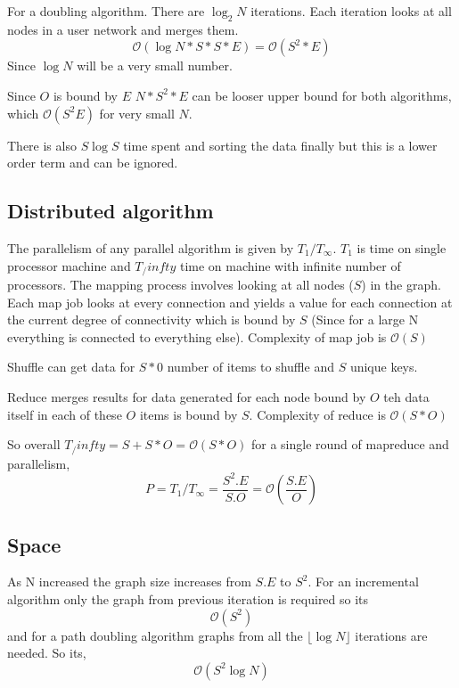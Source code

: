 \documentclass[a4paper]{article}
\begin{document}
For a doubling algorithm. There are $\log_2 N$ iterations. Each iteration looks at all nodes in a user network and merges them. \[\mathcal{O}(\log N * S * S * E) = \mathcal{O}(S^2 * E)\] Since $\log N$ will be a very small number.

Since $O$ is bound by $E$ $N * S^2 * E$ can be looser upper bound for both algorithms, which $\mathcal{O}(S^2 E)$ for very small $N$. 

There is also $S\log S$ time spent and sorting the data finally but this is a lower order term and can be ignored.

\subsection{Distributed algorithm}
The parallelism of any parallel algorithm is given by $T_1/T_\infty$. $T_1$ is time on single processor machine and $T_/infty$ time on machine with infinite number of processors. The mapping process involves looking at all nodes ($S$) in the graph. Each map job looks at every connection and yields a value for each connection at the current degree of connectivity which is bound by $S$ (Since for a large N everything is connected to everything else). Complexity of map job is $\mathcal{O}(S)$

Shuffle can get data for  $S * 0$ number of items to shuffle and $S$ unique keys. 

Reduce merges results for data generated for each node bound by $O$ teh data itself in each of these $O$ items is bound by $S$. Complexity of reduce is $\mathcal{O}(S * O)$

So overall $T_/infty = S + S * O = \mathcal{O}(S * O)$ for a single round of mapreduce and parallelism,
\[P = T_1/T_\infty = \frac{S^2 . E}{S . O}  = \mathcal{O}(\frac{S . E}{O})\]   
\subsection{Space}
As N increased the graph size increases from $S.E$ to $S^2$. For an incremental algorithm only the graph from previous iteration is required so its \[\mathcal{O}(S^2)\] and for a path doubling algorithm graphs from all the $\lfloor\log N\rfloor$ iterations are needed. So its,
\[\mathcal{O}(S^2 \log N)\] 

 
\end{document}
